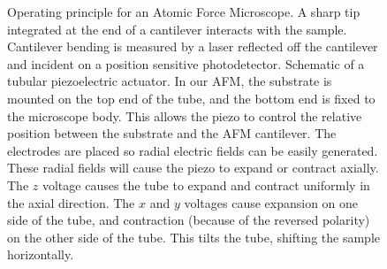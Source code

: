 \begin{figure}
  \begin{center}
    \hspace{.25in}%
    \caption{\protect{} Operating principle
      for an Atomic Force Microscope.  A sharp tip
      integrated at the end of a cantilever interacts with the sample.
      Cantilever bending is measured by a laser reflected off the
      cantilever and incident on a position sensitive photodetector.
      \protect{} Schematic of a tubular
      piezoelectric actuator.  In our AFM, the substrate is mounted on
      the top end of the tube, and the bottom end is fixed to the
      microscope body.  This allows the piezo to control the relative
      position between the substrate and the AFM cantilever.  The
      electrodes are placed so radial electric fields can be easily
      generated.  These radial fields will cause the piezo to expand
      or contract axially.  The $z$ voltage causes the tube to expand
      and contract uniformly in the axial direction.  The $x$ and $y$
      voltages cause expansion on one side of the tube, and
      contraction (because of the reversed polarity) on the other side
      of the tube.  This tilts the tube, shifting the sample
      horizontally.\label{fig:afm-schematic-and-piezo}}
  \end{center}
\end{figure}

